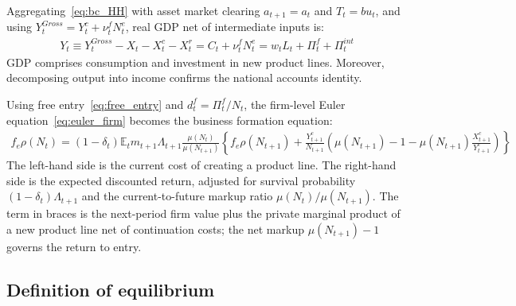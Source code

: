 \documentclass[authoryear, review, 12pt]{elsarticle}
\begin{document}
	Aggregating~\eqref{eq:bc_HH} with asset market clearing 
	$a_{t+1}=a_t$ and $T_t=bu_t$, and using 
	$Y_t^{Gross} = Y_t^c + \nu_t^f N_t^e$, real GDP net 
	of intermediate inputs is:
	\begin{align}\label{eq:gdp}
		Y_t \equiv Y_t^{Gross} - X_t - X_t^c -X_t^r
		= C_t + \nu_t^f N_t^e 
		= w_tL_t + \Pi_t^f + \Pi_t^{int}
	\end{align}
	GDP comprises consumption and investment in new product 
	lines. Moreover, decomposing output into income confirms the national 
	accounts identity.
	
	Using free entry~\eqref{eq:free_entry} and $d_t^f = 
	\Pi_t^f/N_t$, the firm-level Euler 
	equation~\eqref{eq:euler_firm} becomes the business 
	formation equation:
	\begin{align}\label{eq:euler_bf}
		f_e\rho(N_t) = (1-\delta_t)\mathbb{E}_t m_{t+1}
		\Lambda_{t+1}\frac{\mu(N_t)}{\mu(N_{t+1})}
		\left\{f_e\rho(N_{t+1}) + \frac{Y_{t+1}^c}{N_{t+1}}
		\left(\mu(N_{t+1})-1-\mu(N_{t+1})
		\frac{X_{t+1}^c}{Y_{t+1}^c}\right)\right\}
	\end{align}
	The left-hand side is the current cost of creating a 
	product line. The right-hand side is the expected 
	discounted return, adjusted for survival probability 
	$(1-\delta_t)\Lambda_{t+1}$ and the current-to-future 
	markup ratio $\mu(N_t)/\mu(N_{t+1})$. The term in 
	braces is the next-period firm value plus the private 
	marginal product of a new product line net of 
	continuation costs; the net markup $\mu(N_{t+1})-1$ 
	governs the return to entry.
	
	\subsection{Definition of equilibrium}\label{sec:def_eq}
	
\end{document}
